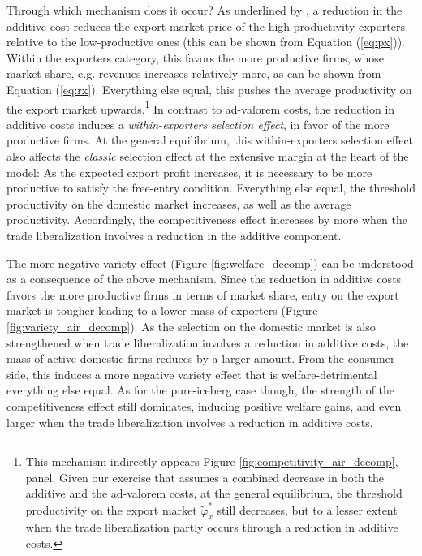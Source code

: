 \documentclass[a4paper,11pt]{article}
\begin{document}
Through which mechanism does it occur? As underlined by \cite{sorensen2014}, a reduction in the additive cost reduces the export-market price of the high-productivity exporters relative to the low-productive ones (this can be shown from Equation (\ref{eq:px})). Within the exporters category, this favors the more productive firms, whose market share, e.g. revenues increases relatively more, as can be shown from Equation (\ref{eq:rx}). Everything else equal, this pushes the average productivity on the export market upwards.\footnote{This mechanism indirectly appears Figure \ref{fig:competitivity_air_decomp}, panel. Given our exercise that assumes a combined decrease in both the additive and the ad-valorem costs, at the general equilibrium, the threshold productivity on the export market $\widetilde{\varphi}^\ast_x$ still decreases, but to a lesser extent when the trade liberalization partly occurs through a reduction in additive costs. } In contrast to ad-valorem costs, the reduction in additive costs induces a \textit{within-exporters selection effect}, in favor of the more productive firms. At the general equilibrium, this within-exporters selection effect also affects the \textit{classic} selection effect at the extensive margin at the heart of the \cite{melitz} model: As the expected export profit increases, it is necessary to be more productive to satisfy the free-entry condition. Everything else equal, the threshold productivity on the domestic market increases, as well as the average productivity. Accordingly, the competitiveness effect increases by more when the trade liberalization involves a reduction in the additive component.

The more negative variety effect (Figure \ref{fig:welfare_decomp}) can be understood as a consequence of the above mechanism. Since the reduction in additive costs favors the more productive firms in terms of market share, entry on the export market is tougher leading to a lower mass of exporters (Figure \ref{fig:variety_air_decomp}). As the selection on the domestic market is also strengthened when trade liberalization involves a reduction in additive costs, the mass of active domestic firms reduces by a larger amount. From the consumer side, this induces a more negative variety effect that is welfare-detrimental everything else equal. As for the pure-iceberg case though, the strength of the competitiveness effect still dominates, inducing positive welfare gains, and even larger when the trade liberalization involves a reduction in additive costs.
\end{document}
